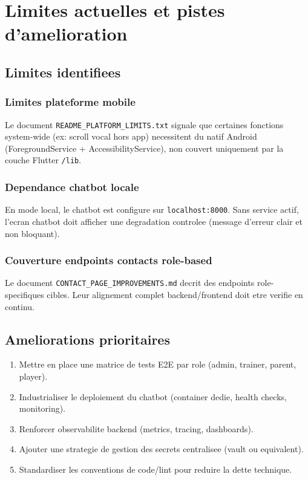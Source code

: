 \chapter{Limites actuelles et pistes d'amelioration}

\section{Limites identifiees}

\subsection*{Limites plateforme mobile}
Le document \texttt{README\_PLATFORM\_LIMITS.txt} signale que certaines fonctions system-wide (ex: scroll vocal hors app) necessitent du natif Android (ForegroundService + AccessibilityService), non couvert uniquement par la couche Flutter \texttt{/lib}.

\subsection*{Dependance chatbot locale}
En mode local, le chatbot est configure sur \texttt{localhost:8000}. Sans service actif, l'ecran chatbot doit afficher une degradation controlee (message d'erreur clair et non bloquant).

\subsection*{Couverture endpoints contacts role-based}
Le document \texttt{CONTACT\_PAGE\_IMPROVEMENTS.md} decrit des endpoints role-specifiques cibles. Leur alignement complet backend/frontend doit etre verifie en continu.

\section{Ameliorations prioritaires}

\begin{enumerate}[leftmargin=*]
  \item Mettre en place une matrice de tests E2E par role (admin, trainer, parent, player).
  \item Industrialiser le deploiement du chatbot (container dedie, health checks, monitoring).
  \item Renforcer observabilite backend (metrics, tracing, dashboards).
  \item Ajouter une strategie de gestion des secrets centralisee (vault ou equivalent).
  \item Standardiser les conventions de code/lint pour reduire la dette technique.
\end{enumerate}

